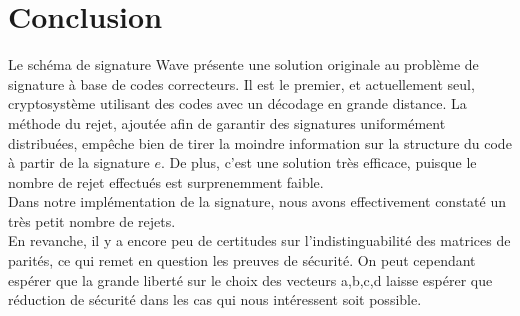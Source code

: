 \documentclass[12pt]{article}
\theoremstyle{plain}
\theoremstyle{definition}
\begin{document}
\section*{Conclusion}
Le schéma de signature Wave présente une solution originale au problème de signature à base de codes correcteurs. Il est le premier, et actuellement seul, cryptosystème utilisant des codes avec un décodage en grande distance.
La méthode du rejet, ajoutée afin de garantir des signatures uniformément distribuées, empêche bien de tirer la moindre information sur la structure du code à partir de la signature $e$. De plus, c'est une solution très efficace, puisque le nombre de rejet effectués est surprenemment faible. \\
Dans notre implémentation de la signature, nous avons effectivement constaté un très petit nombre de rejets. \\
En revanche, il y a encore peu de certitudes sur l'indistinguabilité des matrices de parités, ce qui remet en question les preuves de sécurité. On peut cependant espérer que la grande liberté sur le choix des vecteurs a,b,c,d laisse espérer que réduction de sécurité dans les cas qui nous intéressent soit possible. 


\newpage
\end{document}
